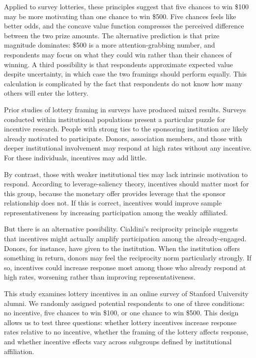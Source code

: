 \documentclass[12pt]{article}
\begin{document}
Applied to survey lotteries, these principles suggest that five chances to win \$100 may be more motivating than one chance to win \$500. Five chances feels like better odds, and the concave value function compresses the perceived difference between the two prize amounts. The alternative prediction is that prize magnitude dominates: \$500 is a more attention-grabbing number, and respondents may focus on what they could win rather than their chances of winning. A third possibility is that respondents approximate expected value despite uncertainty, in which case the two framings should perform equally. This calculation is complicated by the fact that respondents do not know how many others will enter the lottery.

Prior studies of lottery framing in surveys have produced mixed results. Surveys conducted within institutional populations present a particular puzzle for incentive research. People with strong ties to the sponsoring institution are likely already motivated to participate. Donors, association members, and those with deeper institutional involvement may respond at high rates without any incentive. For these individuals, incentives may add little.

By contrast, those with weaker institutional ties may lack intrinsic motivation to respond. According to leverage-saliency theory, incentives should matter most for this group, because the monetary offer provides leverage that the sponsor relationship does not. If this is correct, incentives would improve sample representativeness by increasing participation among the weakly affiliated.

But there is an alternative possibility. Cialdini's reciprocity principle suggests that incentives might actually amplify participation among the already-engaged. Donors, for instance, have given to the institution. When the institution offers something in return, donors may feel the reciprocity norm particularly strongly. If so, incentives could increase response most among those who already respond at high rates, worsening rather than improving representativeness.

This study examines lottery incentives in an online survey of Stanford University alumni. We randomly assigned potential respondents to one of three conditions: no incentive, five chances to win \$100, or one chance to win \$500. This design allows us to test three questions: whether lottery incentives increase response rates relative to no incentive, whether the framing of the lottery affects response, and whether incentive effects vary across subgroups defined by institutional affiliation.
\end{document}
